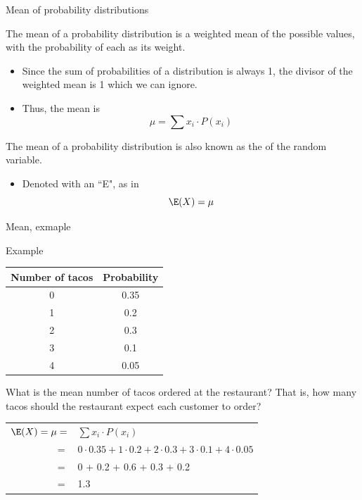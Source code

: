 \documentclass[xcolor=table]{beamer}
\begin{document}
\begin{frame}{Mean of probability distributions}
\begin{block}{}
The mean of a probability distribution is a weighted mean of the possible values, with the probability of each as its weight. 
\begin{itemize}
\pause\item Since the sum of probabilities of a distribution is always 1, the divisor of the weighted mean is 1 which we can ignore.
\pause\item Thus, the mean is
\[\mu = \sum x_i \cdot P(x_i) \]
\end{itemize}
\medskip
\pause
The mean of a probability distribution is also known as the  of the random variable.
\begin{itemize}
\item Denoted with an ``E", as in 
\[\E(X) = \mu \]
\end{itemize}
\end{block}
\end{frame}

\begin{frame}{Mean, exmaple}
\begin{exampleblock}{Example}
{\centering \renewcommand{\arraystretch}{1}
\begin{tabular}{c | c}
Number of tacos & Probability\\
\hline
0 & 0.35\\
1 & 0.2\\
2 & 0.3\\
3 & 0.1\\
4 & 0.05
\end{tabular}\par
\renewcommand{\arraystretch}{1.5}}
\bigskip

What is the mean number of tacos ordered at the restaurant? That is, how many tacos should the restaurant expect each customer to order?\\
\medskip
\pause
{\centering \renewcommand{\arraystretch}{1}
\begin{tabular}{r l}
$\E(X) = \mu =$ & $\sum x_i \cdot P(x_i)$\\
$=$ & $0 \cdot 0.35 + 1 \cdot 0.2 + 2 \cdot 0.3 + 3 \cdot 0.1 + 4 \cdot 0.05$\\
$=$ & 0 + 0.2 + 0.6 + 0.3 + 0.2\\
$=$ & 1.3
\end{tabular}\par
\renewcommand{\arraystretch}{1.5}}

\end{exampleblock}
\end{frame}
\end{document}
